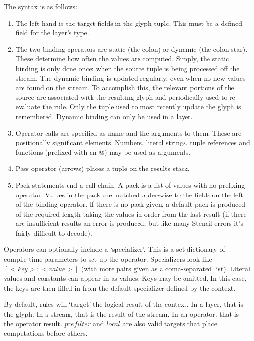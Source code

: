 \documentclass{article}
\begin{document}
The syntax is as follows:
\begin{enumerate}
	\item The left-hand is the target fields in the glyph tuple. This  must be a defined field for the layer's type.
	\item The two binding operators are static (the colon) or dynamic (the colon-star).  
		These determine how often the values are computed.  
		Simply, the static binding is only done once: when the  source tuple is being processed off the stream.  
		The dynamic binding is updated regularly, even when no new values are found on the stream.  
		To accomplish this, the relevant portions of the source are associated with the resulting glyph and periodically used to re-evaluate the rule.  
		Only the tuple used to most recently update the glyph is remembered.   
		Dynamic binding can only be used in a layer.
	\item Operator calls are specified as name and the arguments to them.  
		These are positionally significant elements.  
		Numbers, literal strings, tuple references and functions (prefixed with an @) may be used as arguments.  
	\item Pass operator (arrows) places a tuple on the results stack.  
	\item Pack statements end a call chain.  A pack is a list of values with no prefixing operator.
	         Values in the pack are matched order-wise to the fields on the left of the binding operator.
	         If there is no pack given, a default pack is produced of the required length taking the values in order
	         from the last result (if there are insufficient results an error is produced, but like many Stencil errors it's
	         fairly difficult to decode).
\end{enumerate}

Operators can optionally include a `specializer'.  This is a set dictionary of compile-time parameters to set up the operator.  
Specializers look like $[<key> : <value>]$  (with more pairs given as a coma-separated list).  
Literal values and constants can appear in as values.
Keys may be omitted.  In this case, the keys are then filled in from the default specializer defined by the context.

By default, rules will `target' the logical result of the context.  In a layer, that is the glyph.  
In a stream, that is the result of the stream.  
In an operator, that is the operator result.  $prefilter$ and $local$ are also valid targets that place computations before others.
\end{document}
